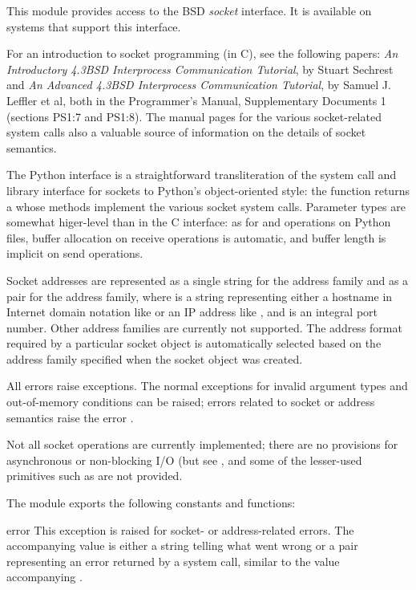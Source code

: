 This module provides access to the BSD {\em socket} interface.
It is available on \UNIX{} systems that support this interface.

For an introduction to socket programming (in C), see the following
papers: \emph{An Introductory 4.3BSD Interprocess Communication
Tutorial}, by Stuart Sechrest and \emph{An Advanced 4.3BSD Interprocess
Communication Tutorial}, by Samuel J.  Leffler et al, both in the
\UNIX{} Programmer's Manual, Supplementary Documents 1 (sections PS1:7
and PS1:8).  The \UNIX{} manual pages for the various socket-related
system calls also a valuable source of information on the details of
socket semantics.

The Python interface is a straightforward transliteration of the
\UNIX{} system call and library interface for sockets to Python's
object-oriented style: the  function returns a
 whose methods implement the various socket system
calls.  Parameter types are somewhat higer-level than in the C
interface: as for  and  operations on Python
files, buffer allocation on receive operations is automatic, and
buffer length is implicit on send operations.

Socket addresses are represented as a single string for the
 address family and as a pair
 for the  address family,
where  is a string representing
either a hostname in Internet domain notation like
 or an IP address like ,
and  is an integral port number.  Other address families are
currently not supported.  The address format required by a particular
socket object is automatically selected based on the address family
specified when the socket object was created.

All errors raise exceptions.  The normal exceptions for invalid
argument types and out-of-memory conditions can be raised; errors
related to socket or address semantics raise the error .

Not all socket operations are currently implemented; there are no
provisions for asynchronous or non-blocking I/O (but see
, and some of the lesser-used primitives such as
 are not provided.

The module  exports the following constants and functions:

\renewcommand{\indexsubitem}{(in module socket)}
\begin{excdesc}{error}
This exception is raised for socket- or address-related errors.
The accompanying value is either a string telling what went wrong or a
pair 
representing an error returned by a system
call, similar to the value accompanying .
\end{excdesc}

